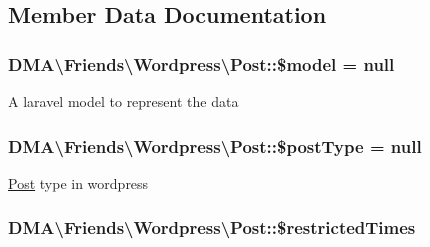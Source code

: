 \subsection{Member Data Documentation}
\hypertarget{classDMA_1_1Friends_1_1Wordpress_1_1Post_a8a3df2e9db7f90d348d27ea9354176b1}{
\subsubsection[{\$model}]{\setlength{\rightskip}{0pt plus 5cm}D\-M\-A\textbackslash{}\-Friends\textbackslash{}\-Wordpress\textbackslash{}\-Post\-::\$model = null}}\label{classDMA_1_1Friends_1_1Wordpress_1_1Post_a8a3df2e9db7f90d348d27ea9354176b1}
A laravel model to represent the data \hypertarget{classDMA_1_1Friends_1_1Wordpress_1_1Post_a9b0ea251e8ba6b7161fc51ffa8fb72d8}{
\subsubsection[{\$post\-Type}]{\setlength{\rightskip}{0pt plus 5cm}D\-M\-A\textbackslash{}\-Friends\textbackslash{}\-Wordpress\textbackslash{}\-Post\-::\$post\-Type = null}}\label{classDMA_1_1Friends_1_1Wordpress_1_1Post_a9b0ea251e8ba6b7161fc51ffa8fb72d8}
\hyperlink{classDMA_1_1Friends_1_1Wordpress_1_1Post}{Post} type in wordpress \hypertarget{classDMA_1_1Friends_1_1Wordpress_1_1Post_ac0b74792fa83b0a9dafda52eec451e50}{
\subsubsection[{\$restricted\-Times}]{\setlength{\rightskip}{0pt plus 5cm}D\-M\-A\textbackslash{}\-Friends\textbackslash{}\-Wordpress\textbackslash{}\-Post\-::\$restricted\-Times\hspace{0.3cm}{\ttfamily [protected]}}}\label{classDMA_1_1Friends_1_1Wordpress_1_1Post_ac0b74792fa83b0a9dafda52eec451e50}
